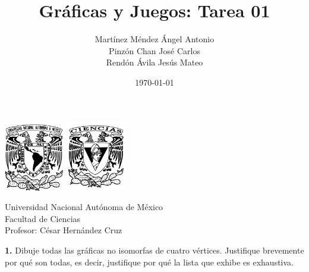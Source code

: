 \documentclass[12pt]{article}
\title{\textbf{Gráficas y Juegos: Tarea 01}}
\author{Martínez Méndez Ángel Antonio\\Pinzón Chan José Carlos\\Rendón Ávila Jesús Mateo}
\date{\today}
\begin{document}
\maketitle
\begin{center}
\vspace{3cm}
\includegraphics[width=0.195\textwidth]{Escudo.png}
\hspace{0.5cm}
\includegraphics[width=0.2\textwidth]{logo_ciencias.png}
\end{center}
\begin{center}
    \vspace{1cm}
    Universidad Nacional Autónoma de México\\
    Facultad de Ciencias\\
    Profesor: César Hernández Cruz\\
\end{center}

\newpage

%
%
\textbf{1.} Dibuje todas las gráficas no isomorfas de cuatro vértices. Justifique brevemente por qué son
todas, es decir, justifique por qué la lista que exhibe es exhaustiva.

\vspace{1cm}
\end{document}
